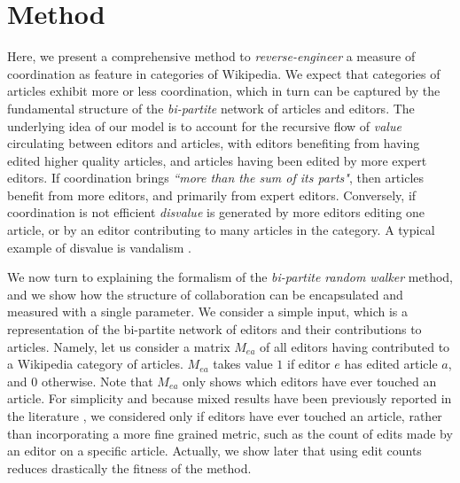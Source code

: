 \section{Method}
\label{method}
Here, we present a comprehensive method to {\it reverse-engineer} a measure of coordination as feature in categories of Wikipedia.  We expect that categories of articles exhibit more or less coordination, which in turn can be captured by the fundamental structure of the {\it bi-partite} network of articles and editors. The underlying idea of our model is to account for the recursive flow of {\it value} circulating between editors and articles, with editors benefiting from having edited higher quality articles, and articles having been edited by more expert editors. If coordination brings {\it ``more than the sum of its parts"}, then articles benefit from more editors, and primarily from expert editors. Conversely, if coordination is not efficient {\it disvalue} is generated by more editors editing one article, or by an editor contributing to many articles in the category. A typical example of disvalue is vandalism \cite{geiger2013}.

We now turn to explaining the formalism of the {\it bi-partite random walker} method, and we show how the structure of collaboration can be encapsulated and measured with a single parameter. We consider a simple input, which is a representation of the bi-partite network of editors and their contributions to articles.  Namely, let us consider a matrix $M_{ea}$ of all editors having contributed to a Wikipedia category of articles. $M_{ea}$ takes value $1$ if editor $e$ has edited article $a$, and $0$ otherwise. Note that $M_{ea}$ only shows which editors have ever touched an article. For simplicity and because mixed results have been previously reported in the literature \cite{wilkinson2007}, we considered only if editors have ever touched an article, rather than incorporating a more fine grained metric, such as the count of edits made by an editor on a specific article. Actually, we show later that using edit counts reduces drastically the fitness of the method. 


